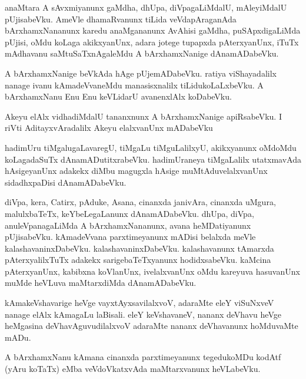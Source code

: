 \documentclass{article}
\begin{document}
\begin{mn}
anaMtara  A  sAvxmiyanunx  gaMdha,  dhUpa,  diVpagaLiMdalU,  mAleyiMdalU  pUjisabeVku.  AmeVle  
dhamaRvanunx  tiLida  veVdapAraganAda  bArxhamxNananunx  karedu  anaMgananunx  AvAhisi  gaMdha,  
puSApxdigaLiMda  pUjisi,  oMdu  koLaga  akikxyanUnx,  adara  jotege  tupapxda  pAterxyanUnx,  
iTuTx  mAdhavanu  saMtuSaTxnAgaleMdu  A  bArxhamxNanige  dAnamADabeVku.
\end{mn}

\begin{mn}
A  bArxhamxNanige  beVkAda  hAge  pUjemADabeVku.  ratiya  viShayadalilx  nanage  ivanu  kAmadeVvaneMdu  
manasisxnalilx  tiLidukoLaLxbeVku.  A  bArxhamxNanu  Enu  Enu  keVLidarU  avanenxlAlx  koDabeVku.  
\end{mn}

\begin{mn}
Akeyu  elAlx  vidhadiMdalU  tananxnunx  A  bArxhamxNanige  apiRsabeVku.  I riVti  
AditayxvAradalilx  Akeyu  elalxvanUnx  mADabeVku
\end{mn}

\begin{mn}
hadimUru  tiMgalugaLavaregU,  tiMgaLu  tiMguLalilxyU,  akikxyanunx  oMdoMdu  koLagadaSuTx  
dAnamADutitxrabeVku.  hadimUraneya  tiMgaLalilx  utatxmavAda  hAsigeyanUnx  adakekx  diMbu  
magugxla  hAsige  muMtAduvelalxvanUnx  sidadhxpaDisi  dAnamADabeVku.
\end{mn}

\begin{mn}
diVpa,  kera,  Catirx,  pAduke,  Asana,  cinanxda  janivAra,  cinanxda  uMgura,  malulxbaTeTx,  
keYbeLegaLanunx  dAnamADabeVku.  dhUpa,  diVpa,  anuleVpanagaLiMda  A  bArxhamxNananunx,  avana  
heMDatiyanunx  pUjisabeVku.  kAmadeVvana  parxtimeyanunx  mADisi  belalxda  meVle  kalashavaninxDabeVku.  
kalashavaninxDabeVku.  kalashavanunx  tAmarxda  pAterxyalilxTuTx  adakekx  sarigebaTeTxyanunx  
hodidxsabeVku.  kaMcina  pAterxyanUnx,  kabibxna  koVlanUnx,  ivelalxvanUnx  oMdu  kareyuva  
hasuvanUnx  muMde  heVLuva  maMtarxdiMda  dAnamADabeVku.
\end{mn}

\begin{mn}
kAmakeVshavarige  heVge  vayxtAyxsavilalxvoV,  adaraMte  eleY  viSuNxveV  nanage  elAlx  
kAmagaLu  laBisali.  eleY  keVshavaneV,  nananx  deVhavu  heVge  heMgasina  deVhavAguvudilalxvoV  
adaraMte  nananx  deVhavanunx  hoMduvaMte  mADu.
\end{mn}

\begin{mn}
A  bArxhamxNanu  kAmana  cinanxda  parxtimeyanunx  tegedukoMDu  kodAtf (yAru  koTaTx) eMba  
veVdoVkatxvAda  maMtarxvanunx  heVLabeVku.
\end{mn}
\end{document}
